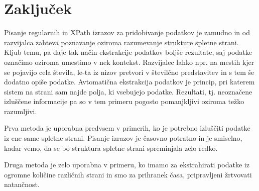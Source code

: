 \documentclass[conference]{IEEEtran}
\begin{document}
	\section{Zaključek}
	
	Pisanje regularnih in XPath izrazov za pridobivanje podatkov je zamudno in od razvijalca zahteva poznavanje oziroma razumevanje strukture spletne strani. Kljub temu, pa daje tak način ekstrakcije podatkov boljše rezultate, saj podatke označimo oziroma umestimo v nek kontekst. Razvijalec lahko npr. na mestih kjer se pojavijo cela števila, le-ta iz nizov pretvori v številčno predstavitev in s tem še dodatno opiše podatke. Avtomatična ekstrakcija podatkov je princip, pri katerem sistem na strani sam najde polja, ki vsebujejo podatke. Rezultati, tj. neoznačene izluščene informacije pa so v tem primeru pogosto pomanjkljivi oziroma težko razumljivi.
	
	Prva metoda je uporabna predvsem v primerih, ko je potrebno izluščiti podatke iz ene same spletne strani. Pisanje izrazov je časovno potratno in je smiselno, kadar vemo, da se bo struktura spletne strani spreminjala zelo redko.
	
	Druga metoda je zelo uporabna v primeru, ko imamo za ekstrahirati podatke iz ogromne količine različnih strani in smo za prihranek časa, pripravljeni žrtvovati natančnost.
	
	
	
	
\end{document}
